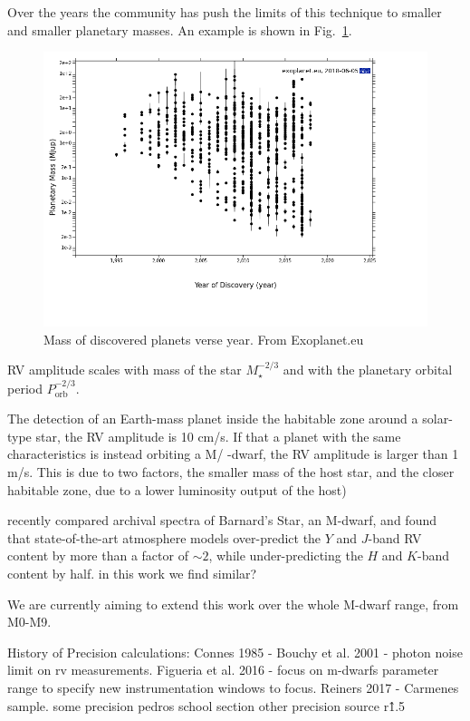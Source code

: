 Over the years the community has push the limits of this technique to smaller and smaller planetary masses. An example is shown in Fig.~\ref{fig:year_mass}.
\begin{figure}

\includegraphics[width=0.8\linewidth]{figures/year_planet_mass.png}
\caption{Mass of discovered planets verse year. From Exoplanet.eu}
\label{fig:year_mass}
\end{figure}


RV amplitude scales with mass of the star $M_\star^{-2/3}$ and with the planetary orbital period $P_\textrm{orb}^{-2/3}$.

The detection of an Earth-mass planet inside the habitable zone around a solar-type star, the RV amplitude is 10 cm/s. If that a planet with the same characteristics is instead orbiting a M/ -dwarf, the RV amplitude is larger than 1 m/s. This is due to two factors, the smaller mass of the host star, and the closer habitable zone, due to a lower luminosity output of the host)

\citet{artigau_optical_2018} recently compared archival spectra of Barnard's Star, an M-dwarf, and found that state-of-the-art atmosphere models over-predict the $Y$ and $J$-band RV content by more than a factor of $\sim$$2$, while under-predicting the $H$ and $K$-band content by half.
{\red{} in this work we find similar?}

We are currently aiming to extend this work over the whole M-dwarf range, from M0-M9.


History of Precision calculations:
Connes 1985 -
Bouchy et al. 2001  - photon noise limit on rv measurements.
Figueria et al. 2016 - focus on m-dwarfs parameter range to specify new instrumentation windows to focus.
Reiners 2017 -  Carmenes sample. some precision
pedros school section other precision source r\^1.5


